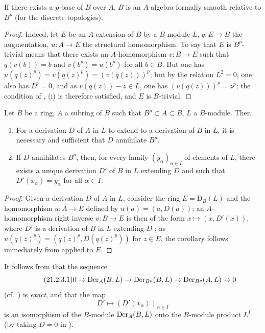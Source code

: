 \begin{corollary}[21.2.2]
\label{0.21.2.2}
If there exists a $p$-base of $B$ over $A$, $B$ is an $A$-algebra formally smooth relative to $B^p$ \textup{(}for the discrete topologies\textup{)}.
\end{corollary}

\begin{proof}
Indeed, let $E$ be an $A$-extension of $B$ by a $B$-module $L$, $q:E\to B$ the augmentation, $u:A\to E$ the structural homomorphism.
To say that $E$ is $B^p$-trivial means that there exists an $A$-homomorphism $v:B\to E$ such that $q(v(b))=b$ and $v(b^p)=u(b^p)$ for all $b\in B$.
But one has $u(q(z)^p)=v(q(z)^p)=(v(q(z)))^p$; but by the relation $L^2=0$, one also has $L^p=0$, and as $v(q(z))-z\in L$, one has $(v(q(z)))^p=z^p$; the condition of , (i) is therefore satisfied, and $E$ is $B$-trivial.
\end{proof}

\begin{corollary}[21.2.3]
\label{0.21.2.3}
Let $B$ be a ring, $A$ a subring of $B$ such that $B^p\subset A\subset B$, $L$ a $B$-module.
Then:
\begin{enumerate}
  \item[\rm(i)] For a derivation $D$ of $A$ in $L$ to extend to a derivation of $B$ in $L$, it is necessary and sufficient that $D$ annihilate $B^p$.
  \item[\rm(ii)] If $D$ annihilates $B^p$, then, for every family $(y_\alpha)_{\alpha\in I}$ of elements of $L$, there exists a unique derivation $D'$ of $B$ in $L$ extending $D$ and such that $D'(x_\alpha)=y_\alpha$ for all $\alpha\in I$.
\end{enumerate}
\end{corollary}

\begin{proof}
Given a derivation $D$ of $A$ in $L$, consider the ring $E=\mathrm{D}_B(L)$ and the homomorphism $u:A\to E$ defined by $u(a)=(a,D(a))$; an $A$-homomorphism right inverse $v:B\to E$ is then of the form $x\mapsto(x,D'(x))$, where $D'$ is a derivation of $B$ in $L$ extending $D$ ; as $u(q(z)^p)=(q(z)^p,D(q(z)^p))$ for $z\in E$, the corollary follows immediately from  applied to $E$.
\end{proof}

It follows from  that the sequence
\begin{equation}
\tag{21.2.3.1}
  \label{0.21.2.3.1}
  0\to\operatorname{Der}_A(B,L)\to\operatorname{Der}_{B^p}(B,L)\to\operatorname{Der}_{B^p}(A,L)\to 0
\end{equation}
(cf.\ ) is \emph{exact}, and that the map
\begin{equation}
\tag{21.2.3.2}
  \label{0.21.2.3.2}
  D'\mapsto(D'(x_\alpha))_{\alpha\in I}
\end{equation}
is an isomorphism of the $B$-module $\operatorname{Der}_A(B,L)$ onto the $B$-module product $L^I$ (by taking $D=0$ in ).

